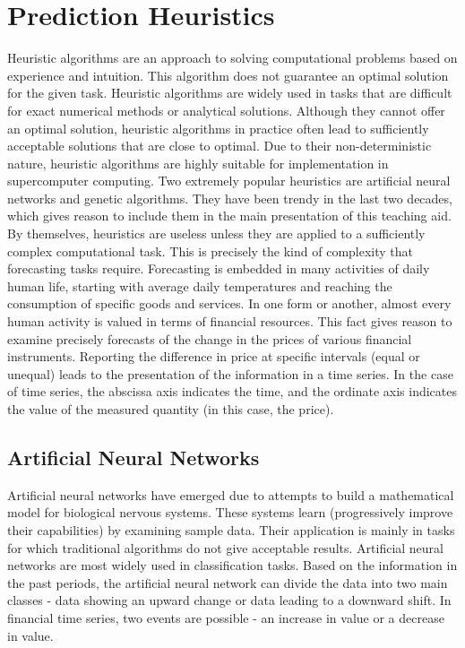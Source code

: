\newpage
\chapter{Prediction Heuristics}
\label{chapter02}

Heuristic algorithms are an approach to solving computational problems based on experience and intuition. This algorithm does not guarantee an optimal solution for the given task. Heuristic algorithms are widely used in tasks that are difficult for exact numerical methods or analytical solutions. Although they cannot offer an optimal solution, heuristic algorithms in practice often lead to sufficiently acceptable solutions that are close to optimal. Due to their non-deterministic nature, heuristic algorithms are highly suitable for implementation in supercomputer computing. Two extremely popular heuristics are artificial neural networks and genetic algorithms. They have been trendy in the last two decades, which gives reason to include them in the main presentation of this teaching aid. By themselves, heuristics are useless unless they are applied to a sufficiently complex computational task. This is precisely the kind of complexity that forecasting tasks require. Forecasting is embedded in many activities of daily human life, starting with average daily temperatures and reaching the consumption of specific goods and services. In one form or another, almost every human activity is valued in terms of financial resources. This fact gives reason to examine precisely forecasts of the change in the prices of various financial instruments. Reporting the difference in price at specific intervals (equal or unequal) leads to the presentation of the information in a time series. In the case of time series, the abscissa axis indicates the time, and the ordinate axis indicates the value of the measured quantity (in this case, the price).

\section{Artificial Neural Networks}

Artificial neural networks have emerged due to attempts to build a mathematical model for biological nervous systems. These systems learn (progressively improve their capabilities) by examining sample data. Their application is mainly in tasks for which traditional algorithms do not give acceptable results. Artificial neural networks are most widely used in classification tasks. Based on the information in the past periods, the artificial neural network can divide the data into two main classes - data showing an upward change or data leading to a downward shift. In financial time series, two events are possible - an increase in value or a decrease in value.

